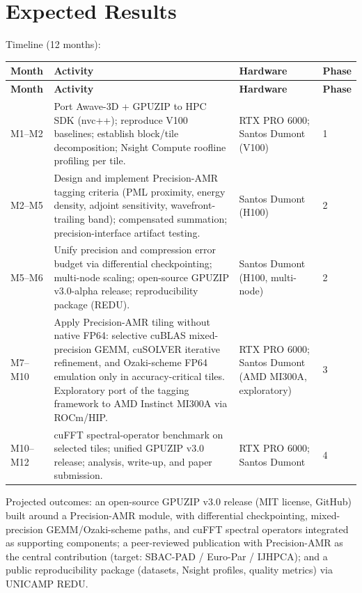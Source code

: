 \documentclass[12pt,a4paper]{article}
\begin{document}
\section{Expected Results}

Timeline (12 months):

\begin{longtable}{@{}p{}p{}p{}p{}@{}}
\toprule
\textbf{Month} & \textbf{Activity} & \textbf{Hardware} & \textbf{Phase}\\
\midrule
\endfirsthead
\toprule
\textbf{Month} & \textbf{Activity} & \textbf{Hardware} & \textbf{Phase}\\
\midrule
\endhead
\bottomrule
\endfoot
M1--M2 & Port Awave-3D + GPUZIP to HPC SDK (nvc++); reproduce V100 baselines;
establish block/tile decomposition; Nsight Compute roofline profiling per tile.
& RTX PRO 6000; Santos Dumont (V100) & 1\\
\addlinespace
M2--M5 & Design and implement Precision-AMR tagging criteria (PML proximity,
energy density, adjoint sensitivity, wavefront-trailing band); compensated
summation; precision-interface artifact testing. & Santos Dumont (H100) & 2\\
\addlinespace
M5--M6 & Unify precision and compression error budget via differential
checkpointing; multi-node scaling; open-source GPUZIP v3.0-alpha release;
reproducibility package (REDU). & Santos Dumont (H100, multi-node) & 2\\
\addlinespace
M7--M10 & Apply Precision-AMR tiling without native FP64: selective cuBLAS
mixed-precision GEMM, cuSOLVER iterative refinement, and Ozaki-scheme FP64
emulation only in accuracy-critical tiles. Exploratory port of the tagging
framework to AMD Instinct MI300A via ROCm/HIP. & RTX PRO 6000; Santos Dumont
(AMD MI300A, exploratory) & 3\\
\addlinespace
M10--M12 & cuFFT spectral-operator benchmark on selected tiles; unified GPUZIP
v3.0 release; analysis, write-up, and paper submission. & RTX PRO 6000; Santos
Dumont & 4\\
\end{longtable}

Projected outcomes: an open-source GPUZIP v3.0 release (MIT license, GitHub)
built around a Precision-AMR module, with differential checkpointing,
mixed-precision GEMM/Ozaki-scheme paths, and cuFFT spectral operators integrated
as supporting components; a peer-reviewed publication with Precision-AMR as the
central contribution (target: SBAC-PAD / Euro-Par / IJHPCA); and a public
reproducibility package (datasets, Nsight profiles, quality metrics) via UNICAMP
REDU.
\end{document}

